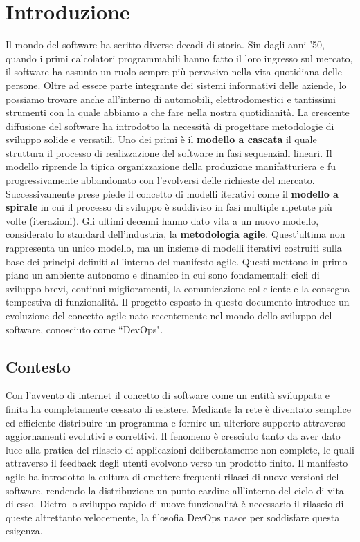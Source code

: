 
\chapter{Introduzione}\label{chap:introduction}
Il mondo del software ha scritto diverse decadi di storia. Sin dagli anni '50, quando i primi calcolatori programmabili hanno fatto il loro ingresso sul mercato, il software ha assunto un ruolo sempre più pervasivo nella vita quotidiana delle persone. Oltre ad essere parte integrante dei sistemi informativi delle aziende, lo possiamo trovare anche all'interno di automobili, elettrodomestici e tantissimi strumenti con la quale abbiamo a che fare nella nostra quotidianità. La crescente diffusione del software ha introdotto la necessità di progettare metodologie di sviluppo solide e versatili. Uno dei primi è il \textbf{modello a cascata} il quale struttura il processo di realizzazione del software in fasi sequenziali lineari. Il modello riprende la tipica organizzazione della produzione manifatturiera e fu progressivamente abbandonato con l'evolversi delle richieste del mercato. Successivamente prese piede il concetto di modelli iterativi come il \textbf{modello a spirale} in cui il processo di sviluppo è suddiviso in fasi multiple ripetute più volte (iterazioni). Gli ultimi decenni hanno dato vita a un nuovo modello, considerato lo standard dell'industria, la \textbf{metodologia agile}. Quest'ultima non rappresenta un unico modello, ma un insieme di modelli iterativi costruiti sulla base dei principi definiti all'interno del manifesto agile. Questi mettono in primo piano un ambiente autonomo e dinamico in cui sono fondamentali: cicli di sviluppo brevi, continui miglioramenti, la comunicazione col cliente e la consegna tempestiva di funzionalità. Il progetto esposto in questo documento introduce un evoluzione del concetto agile nato recentemente nel mondo dello sviluppo del software, conosciuto come ``DevOps".

\section{Contesto}
Con l'avvento di internet il concetto di software come un entità sviluppata e finita ha completamente cessato di esistere. Mediante la rete è diventato semplice ed efficiente distribuire un programma e fornire un ulteriore supporto attraverso aggiornamenti evolutivi e correttivi. Il fenomeno è cresciuto tanto da aver dato luce alla pratica del rilascio di applicazioni deliberatamente non complete, le quali attraverso il feedback degli utenti evolvono verso un prodotto finito. Il manifesto agile ha introdotto la cultura di emettere frequenti rilasci di nuove versioni del software, rendendo la distribuzione un punto cardine all'interno del ciclo di vita di esso. Dietro lo sviluppo rapido di nuove funzionalità è necessario il rilascio di queste altrettanto velocemente, la filosofia DevOps nasce per soddisfare questa esigenza.

